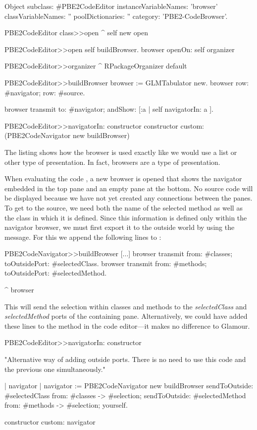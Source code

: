 \documentclass[a4paper,10pt,twoside]{book}
\begin{document}
\begin{code}{}
Object subclass: #PBE2CodeEditor
	instanceVariableNames: 'browser'
	classVariableNames: ''
	poolDictionaries: ''
	category: 'PBE2-CodeBrowser'.

PBE2CodeEditor class>>open
  ^ self new open

PBE2CodeEditor>>open
  self buildBrowser.
  browser openOn:  self  organizer

PBE2CodeEditor>>organizer 
  ^ RPackageOrganizer default

PBE2CodeEditor>>buildBrowser 
  browser := GLMTabulator new.
  browser 
    row: #navigator;
    row: #source.
    
  browser transmit to: #navigator; andShow:  [:a | self navigatorIn: a ]. 

PBE2CodeEditor>>navigatorIn:  constructor
  constructor  custom:  (PBE2CodeNavigator new buildBrowser)
\end{code}


The listing shows how the browser is used exactly like we would use a
list or other type of presentation. In fact, browsers are a type of
presentation.

When evaluating the code , a new browser is
opened that shows the navigator embedded in the top pane and an empty
pane at the bottom. No source code will be displayed because we have
not yet created any connections between the panes. To get to the
source, we need both the name of the selected method as well as the
class in which it is defined. Since this information is defined only
within the navigator browser, we must first export it to the outside
world by using the  message. For this we
append the following lines to :

\begin{code}{}
PBE2CodeNavigator>>buildBrowser
  [...]
  browser transmit from: #classes; toOutsidePort:  #selectedClass. 
  browser transmit from: #methods; toOutsidePort:  #selectedMethod.
  
  ^ browser
\end{code}

This will send the selection within classes and methods to the
\emph{selectedClass} and \emph{selectedMethod} ports of the containing
pane. Alternatively, we could have added these lines to the
 method in the code editor---it makes no difference
to Glamour.

\begin{code}{}
PBE2CodeEditor>>navigatorIn: constructor

  "Alternative way of adding outside ports. There is no need to use this
   code and the previous one simultaneously."

  | navigator |
  navigator := PBE2CodeNavigator new buildBrowser
          sendToOutside: #selectedClass from: #classes -> #selection;
          sendToOutside: #selectedMethod from: #methods -> #selection;
          yourself.
  
  constructor custom: navigator
\end{code}
\end{document}
